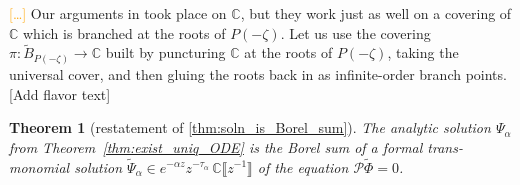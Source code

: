 \documentclass{article}
\newcommand{\maps}{\colon}
\newcommand{\C}{\mathbb{C}}
\newcommand{\series}[1]{\tilde{#1}}
\theoremstyle{definition}
\theoremstyle{plain}
\newtheorem{theorem}{Theorem}[section]
\newenvironment{todo}{\color{Coral}}{\color{black}}
\newenvironment{old}{\color{RoyalBlue}}{\color{black}}
\begin{document}
\begin{old}
\textcolor{orange}{[\ldots]} Our arguments in \cite{reg-sing-volterra} took place on $\C$, but they work just as well on a covering of $\C$ which is branched at the roots of $P(-\zeta)$. Let us use the covering $\pi \maps \widetilde{B}_{P(-\zeta)} \to \C$ built by puncturing $\C$ at the roots of $P(-\zeta)$, taking the universal cover, and then gluing the roots back in as infinite-order branch points.
\end{old}
\begin{todo}[Add flavor text]\end{todo}
\begin{theorem}[restatement of \ref{thm:soln_is_Borel_sum}]\label{re:thm:soln_is_Borel_sum}
The analytic solution $\Psi_\alpha$ from Theorem~\ref{thm:exist_uniq_ODE} is the Borel sum of a formal trans-monomial solution $\series{\Psi}_\alpha \in e^{-\alpha z} z^{-\tau_\alpha}\,\C \llbracket z^{-1} \rrbracket$ of the equation $\mathcal{P}\series{\Phi} = 0$.
\end{theorem}
\end{document}

